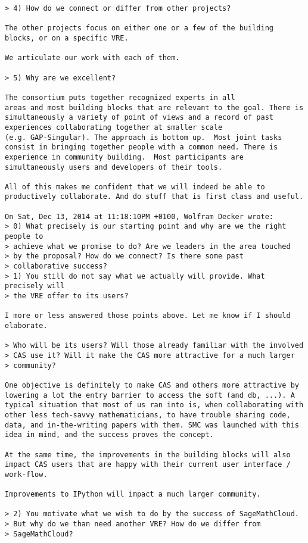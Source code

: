 \begin{draft}
\begin{verbatim}
> 4) How do we connect or differ from other projects?

The other projects focus on either one or a few of the building
blocks, or on a specific VRE.

We articulate our work with each of them.

> 5) Why are we excellent?

The consortium puts together recognized experts in all
areas and most building blocks that are relevant to the goal. There is
simultaneously a variety of point of views and a record of past
experiences collaborating together at smaller scale
(e.g. GAP-Singular). The approach is bottom up.  Most joint tasks
consist in bringing together people with a common need. There is
experience in community building.  Most participants are
simultaneously users and developers of their tools.

All of this makes me confident that we will indeed be able to
productively collaborate. And do stuff that is first class and useful.

On Sat, Dec 13, 2014 at 11:18:10PM +0100, Wolfram Decker wrote:
> 0) What precisely is our starting point and why are we the right people to
> achieve what we promise to do? Are we leaders in the area touched
> by the proposal? How do we connect? Is there some past
> collaborative success?
> 1) You still do not say what we actually will provide. What precisely will
> the VRE offer to its users?

I more or less answered those points above. Let me know if I should
elaborate.

> Who will be its users? Will those already familiar with the involved
> CAS use it? Will it make the CAS more attractive for a much larger
> community?

One objective is definitely to make CAS and others more attractive by
lowering a lot the entry barrier to access the soft (and db, ...). A
typical situation that most of us ran into is, when collaborating with
other less tech-savvy mathematicians, to have trouble sharing code,
data, and in-the-writing papers with them. SMC was launched with this
idea in mind, and the success proves the concept.

At the same time, the improvements in the building blocks will also
impact CAS users that are happy with their current user interface /
work-flow.

Improvements to IPython will impact a much larger community.

> 2) You motivate what we wish to do by the success of SageMathCloud.
> But why do we than need another VRE? How do we differ from
> SageMathCloud?


\end{verbatim}
\end{draft}
